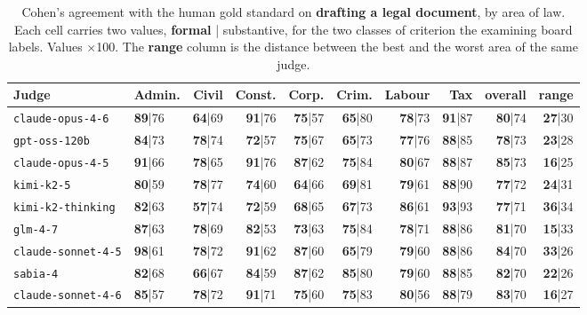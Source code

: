 \documentclass{IOS-Book-Article}
\begin{document}
\begin{table}[!ht]
\centering
\caption{Cohen's agreement with the human gold standard on \textbf{drafting a legal document}, by area of law. Each cell carries two values, \textbf{formal} | substantive, for the two classes of criterion the examining board labels. Values $\times$100. The \textbf{range} column is the distance between the best and the worst area of the same judge.}
\footnotesize\setlength{\tabcolsep}{2pt}
\begin{tabular}{llrrrrrrrr}
\hline
\textbf{Judge} & \textbf{Admin.} & \textbf{Civil} & \textbf{Const.} & \textbf{Corp.} & \textbf{Crim.} & \textbf{Labour} & \textbf{Tax} & \textbf{overall} & \textbf{range} \\
\hline
\texttt{claude-opus-4-6} & \textbf{89}|76 & \textbf{64}|69 & \textbf{91}|76 & \textbf{75}|57 & \textbf{65}|80 & \textbf{78}|73 & \textbf{91}|87 & \textbf{80}|74 & \textbf{27}|30 \\
\texttt{gpt-oss-120b} & \textbf{84}|73 & \textbf{78}|74 & \textbf{72}|57 & \textbf{75}|67 & \textbf{65}|73 & \textbf{77}|76 & \textbf{88}|85 & \textbf{78}|73 & \textbf{23}|28 \\
\texttt{claude-opus-4-5} & \textbf{91}|66 & \textbf{78}|65 & \textbf{91}|76 & \textbf{87}|62 & \textbf{75}|84 & \textbf{80}|67 & \textbf{88}|87 & \textbf{85}|73 & \textbf{16}|25 \\
\texttt{kimi-k2-5} & \textbf{80}|59 & \textbf{78}|77 & \textbf{74}|60 & \textbf{64}|66 & \textbf{69}|81 & \textbf{79}|61 & \textbf{88}|90 & \textbf{77}|72 & \textbf{24}|31 \\
\texttt{kimi-k2-thinking} & \textbf{82}|63 & \textbf{57}|74 & \textbf{72}|59 & \textbf{68}|65 & \textbf{67}|73 & \textbf{86}|61 & \textbf{93}|93 & \textbf{77}|71 & \textbf{36}|34 \\
\texttt{glm-4-7} & \textbf{87}|63 & \textbf{78}|69 & \textbf{82}|53 & \textbf{73}|63 & \textbf{75}|84 & \textbf{78}|71 & \textbf{88}|86 & \textbf{81}|70 & \textbf{15}|33 \\
\texttt{claude-sonnet-4-5} & \textbf{98}|61 & \textbf{78}|72 & \textbf{91}|62 & \textbf{87}|60 & \textbf{65}|79 & \textbf{79}|60 & \textbf{88}|86 & \textbf{84}|70 & \textbf{33}|26 \\
\texttt{sabia-4} & \textbf{82}|68 & \textbf{66}|67 & \textbf{84}|59 & \textbf{87}|62 & \textbf{85}|80 & \textbf{79}|60 & \textbf{88}|85 & \textbf{82}|70 & \textbf{22}|26 \\
\texttt{claude-sonnet-4-6} & \textbf{85}|57 & \textbf{78}|72 & \textbf{91}|71 & \textbf{75}|60 & \textbf{75}|83 & \textbf{80}|56 & \textbf{88}|79 & \textbf{83}|70 & \textbf{16}|27 \\

\end{tabular}
\end{table}
\end{document}
